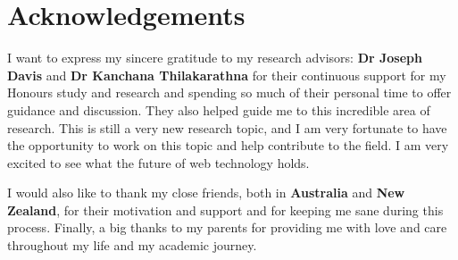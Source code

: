 \chapter*{Acknowledgements}

I want to express my sincere gratitude to my research advisors: \textbf{Dr Joseph Davis} and \textbf{Dr Kanchana Thilakarathna} for their continuous support for my Honours study and research and spending so much of their personal time to offer guidance and discussion. They also helped guide me to this incredible area of research. This is still a very new research topic, and I am very fortunate to have the opportunity to work on this topic and help contribute to the field. I am very excited to see what the future of web technology holds.

I would also like to thank my close friends, both in \textbf{Australia} and \textbf{New Zealand}, for their motivation and support and for keeping me sane during this process. Finally, a big thanks to my parents for providing me with love and care throughout my life and my academic journey.